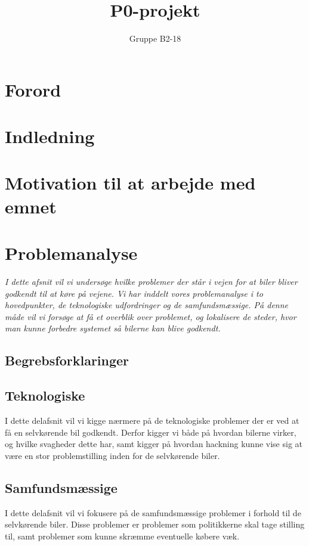 \documentclass[12pt,hidelinks]{article}
\begin{document}
    \sloppy
	\title{P0-projekt}
	\author{Gruppe B2-18}
	\maketitle
	\newpage
	\section{Forord}
	\newpage
	\tableofcontents
	\newpage
	\section{Indledning}
	\section{Motivation til at arbejde med emnet}
	
	\section{Problemanalyse}
	\textit{I dette afsnit vil vi undersøge hvilke problemer der står i vejen for at biler bliver godkendt til at køre på vejene. Vi har inddelt vores problemanalyse i to hovedpunkter, de teknologiske udfordringer og de samfundsmæssige. På denne måde vil vi forsøge at få et overblik over problemet, og lokalisere de steder, hvor man kunne forbedre systemet så bilerne kan blive godkendt.}
	\subsection{Begrebsforklaringer}
	
	\subsection{Teknologiske}
	I dette delafsnit vil vi kigge nærmere på de teknologiske problemer der er ved at få en selvkørende bil godkendt. Derfor kigger vi både på hvordan bilerne virker, og hvilke svagheder dette har, samt kigger på hvordan hackning kunne vise sig at være en stor problemstilling inden for de selvkørende biler.
	
	
	
    
	\subsection{Samfundsmæssige}
	I dette delafsnit vil vi fokusere på de samfundsmæssige problemer i forhold til de selvkørende biler. Disse problemer er problemer som politikkerne skal tage stilling til, samt problemer som kunne skræmme eventuelle købere væk.
	
	
	
	
\end{document}
